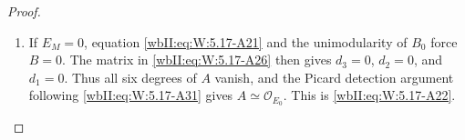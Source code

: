 \begin{proof}
\begin{enumerate}[label={$\langle1\rangle$\arabic*.},leftmargin=*]
\item If \(E_M=0\), equation \eqref{wbII:eq:W:5.17-A21} and the unimodularity of \(B_0\) force
\(B=0\).  The matrix in \eqref{wbII:eq:W:5.17-A26} then gives
\(d_3=0\), \(d_2=0\), and \(d_1=0\).  Thus all six degrees of \(A\)
vanish, and the Picard detection argument following \eqref{wbII:eq:W:5.17-A31} gives
\(A\simeq\mathcal O_{E_0}\).  This is \eqref{wbII:eq:W:5.17-A22}.

\end{enumerate}
\end{proof}
